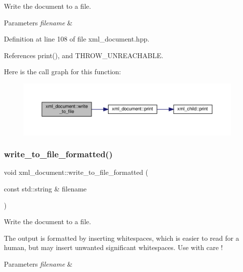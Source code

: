 Write the document to a file. 


\begin{DoxyParams}{Parameters}
{\em filename} & \\
\hline
\end{DoxyParams}


Definition at line 108 of file xml\+\_\+document.\+hpp.



References print(), and T\+H\+R\+O\+W\+\_\+\+U\+N\+R\+E\+A\+C\+H\+A\+B\+LE.

Here is the call graph for this function\+:
\nopagebreak
\begin{figure}[H]
\begin{center}
\leavevmode
\includegraphics[width=350pt]{d8/dee/classxml__document_a82df368faa79a46d8f4b9e635b5bcfac_cgraph}
\end{center}
\end{figure}
\mbox{\label{classxml__document_a9dd04cd3a1d5157886388a17134bafa1}} 
\subsubsection{\texorpdfstring{write\+\_\+to\+\_\+file\+\_\+formatted()}{write\_to\_file\_formatted()}}
{\footnotesize\ttfamily void xml\+\_\+document\+::write\+\_\+to\+\_\+file\+\_\+formatted (\begin{DoxyParamCaption}\item[{const std\+::string \&}]{filename }\end{DoxyParamCaption})\hspace{0.3cm}{\ttfamily [inline]}}



Write the document to a file. 

The output is formatted by inserting whitespaces, which is easier to read for a human, but may insert unwanted significant whitespaces. Use with care ! 
\begin{DoxyParams}{Parameters}
{\em filename} & \\
\hline
\end{DoxyParams}


